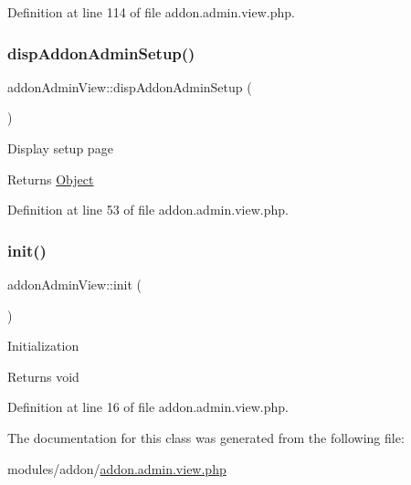Definition at line 114 of file addon.\+admin.\+view.\+php.

\mbox{\label{classaddonAdminView_a14aef8b4e451f5eac1872ddc00530d50}} 
\subsubsection{\texorpdfstring{disp\+Addon\+Admin\+Setup()}{dispAddonAdminSetup()}}
{\footnotesize\ttfamily addon\+Admin\+View\+::disp\+Addon\+Admin\+Setup (\begin{DoxyParamCaption}{ }\end{DoxyParamCaption})}

Display setup page

\begin{DoxyReturn}{Returns}
\hyperlink{classObject}{Object} 
\end{DoxyReturn}


Definition at line 53 of file addon.\+admin.\+view.\+php.

\mbox{\label{classaddonAdminView_a2a2cd475d7a4d6111e7e9b3dafb4de01}} 
\subsubsection{\texorpdfstring{init()}{init()}}
{\footnotesize\ttfamily addon\+Admin\+View\+::init (\begin{DoxyParamCaption}{ }\end{DoxyParamCaption})}

Initialization

\begin{DoxyReturn}{Returns}
void 
\end{DoxyReturn}


Definition at line 16 of file addon.\+admin.\+view.\+php.



The documentation for this class was generated from the following file\+:\begin{DoxyCompactItemize}
\item 
modules/addon/\hyperlink{addon_8admin_8view_8php}{addon.\+admin.\+view.\+php}\end{DoxyCompactItemize}
